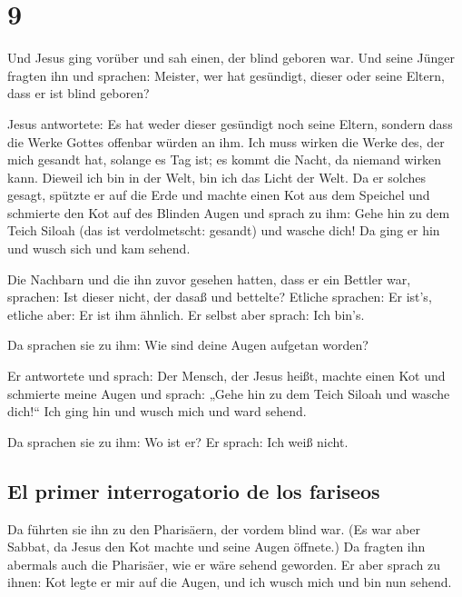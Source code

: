 \hypertarget{section-8}{%
\section{9}\label{section-8}}

 Und Jesus ging vorüber und sah einen, der blind geboren
war.  Und seine Jünger fragten ihn und sprachen: Meister,
wer hat gesündigt, dieser oder seine Eltern, dass er ist blind geboren?

 Jesus antwortete: Es hat weder dieser gesündigt noch
seine Eltern, sondern dass die Werke Gottes offenbar würden an ihm.
 Ich muss wirken die Werke des, der mich gesandt hat,
solange es Tag ist; es kommt die Nacht, da niemand wirken kann.
 Dieweil ich bin in der Welt, bin ich das Licht der Welt.
 Da er solches gesagt, spützte er auf die Erde und machte
einen Kot aus dem Speichel und schmierte den Kot auf des Blinden Augen
 und sprach zu ihm: Gehe hin zu dem Teich Siloah (das ist
verdolmetscht: gesandt) und wasche dich! Da ging er hin und wusch sich
und kam sehend.

 Die Nachbarn und die ihn zuvor gesehen hatten, dass er
ein Bettler war, sprachen: Ist dieser nicht, der dasaß und bettelte?
 Etliche sprachen: Er ist's, etliche aber: Er ist ihm
ähnlich. Er selbst aber sprach: Ich bin's.

 Da sprachen sie zu ihm: Wie sind deine Augen aufgetan
worden?

 Er antwortete und sprach: Der Mensch, der Jesus heißt,
machte einen Kot und schmierte meine Augen und sprach: „Gehe hin zu dem
Teich Siloah und wasche dich!{}`` Ich ging hin und wusch mich und ward
sehend.

 Da sprachen sie zu ihm: Wo ist er? Er sprach: Ich weiß
nicht.

\hypertarget{el-primer-interrogatorio-de-los-fariseos}{%
\subsection{El primer interrogatorio de los
fariseos}\label{el-primer-interrogatorio-de-los-fariseos}}

 Da führten sie ihn zu den Pharisäern, der vordem blind
war.  (Es war aber Sabbat, da Jesus den Kot machte und
seine Augen öffnete.)  Da fragten ihn abermals auch die
Pharisäer, wie er wäre sehend geworden. Er aber sprach zu ihnen: Kot
legte er mir auf die Augen, und ich wusch mich und bin nun sehend.

